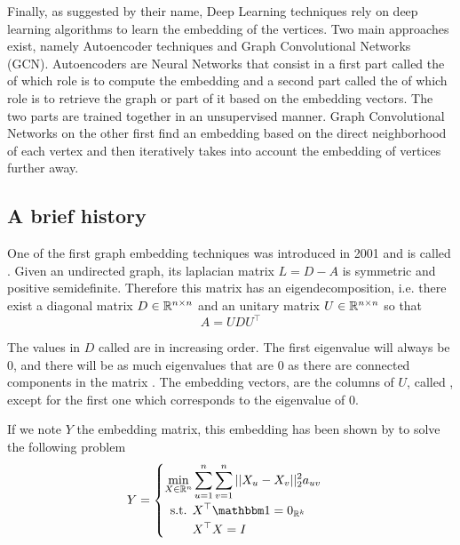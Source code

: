 Finally, as suggested by their name, Deep Learning techniques rely on deep learning algorithms to learn the embedding of the vertices. Two main approaches exist, namely Autoencoder techniques and Graph Convolutional Networks (GCN). Autoencoders are Neural Networks that consist in a first part called the  of which role is to compute the embedding and a second part called the  of which role is to retrieve the graph or part of it based on the embedding vectors. The two parts are trained together in an unsupervised manner. Graph Convolutional Networks on the other first find an embedding based on the direct neighborhood of each vertex and then iteratively takes into account the embedding of vertices further away.

\subsection{A brief history}
One of the first graph embedding techniques was introduced in 2001 and is called  \cite{belkin2001_spectralEmbedding}. Given an undirected graph, its laplacian matrix $ L = D - A$ is symmetric and positive semidefinite. Therefore this matrix has an eigendecomposition, i.e. there exist a diagonal matrix $D \in \mathbb{R}^{n\times n}$ and an unitary matrix $U \in \mathbb{R}^{n \times n}$ so that
\begin{equation}
    A = U D U^\top
\end{equation}

The values in $D$ called  are in increasing order. The first eigenvalue will always be $0$, and there will be as much eigenvalues that are $0$ as there are connected components in the matrix \cite{belkin2001_spectralEmbedding}. The embedding vectors, are the columns of $U$, called , except for the first one which corresponds to the eigenvalue of 0.

If we note $Y$ the embedding matrix, this embedding has been shown by \cite{belkin2001_spectralEmbedding} to solve the following problem
\begin{equation}
    Y = \begin{cases}
    \begin{aligned}
        \min_{X \in \realset^n} &\sum_{u = 1}^n\sum_{v=1}^n ||X_u - X_v||_2^2a_{uv}\\
        \text{s.t.  } & X^\top \ones = \zeros{\realset^k}\\
                    & X^\top X = I
    \end{aligned}
    \end{cases}
\end{equation}

